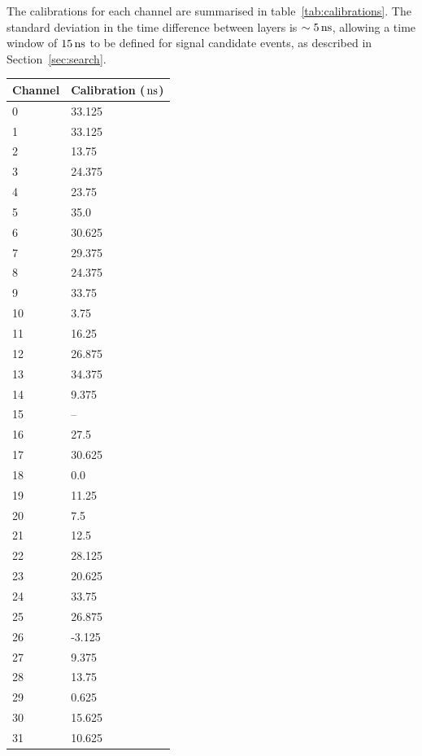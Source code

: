 \documentclass[12pt]{article}
\newcommand{\unit}[1]{\ensuremath{\text{\,#1}}\xspace}
\begin{document}
The calibrations for each channel are summarised in table~\ref{tab:calibrations}. The 
standard deviation in the time difference between layers is $\sim5\unit{ns}$, allowing 
a time window of $15\unit{ns}$ to be defined for signal candidate events, as described in 
Section~\ref{sec:search}.

\begin{table}[ht!]
    \centering
    \scriptsize
	\begin{tabular}{ll}
	    Channel & Calibration (\unit{ns}) \\ 
	    \hline
	    0 &  33.125   \\
	    1 &  33.125  \\
	    2 &  13.75   \\ 
	    3 &  24.375  \\
	    4 &  23.75   \\
	    5 &  35.0    \\
	    6 &  30.625  \\
	    7 &  29.375  \\
	    8 &  24.375  \\
	    9 &  33.75   \\
	    10 & 3.75    \\
	    11 & 16.25   \\
	    12 & 26.875  \\  
	    13 & 34.375  \\
	    14 & 9.375   \\
	    15 & --     \\
	    16 & 27.5    \\
	    17 & 30.625  \\
	    18 & 0.0     \\
	    19 & 11.25   \\
	    20 & 7.5     \\
	    21 & 12.5    \\
	    22 & 28.125  \\
	    23 & 20.625  \\
	    24 & 33.75   \\
	    25 & 26.875  \\
	    26 & -3.125  \\
	    27 & 9.375   \\
	    28 & 13.75   \\
	    29 & 0.625   \\
	    30 & 15.625  \\
	    31 & 10.625     \\ 
	\end{tabular}
\end{table}
\end{document}
